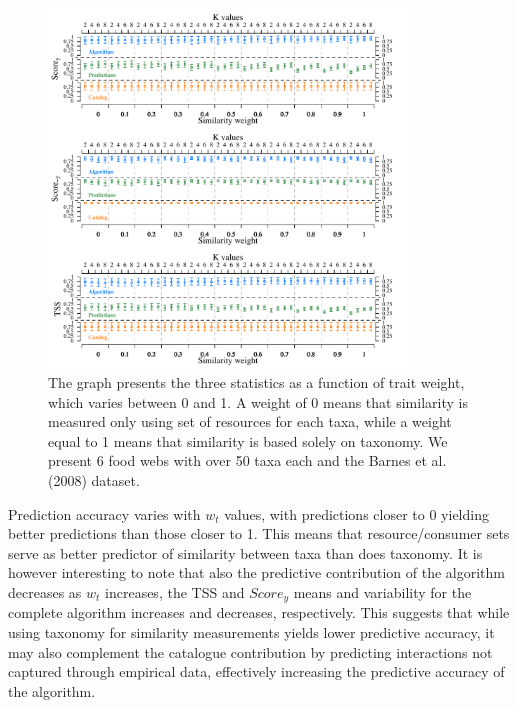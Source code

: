 \documentclass[letterpaper]{article}
\begin{document}
\begin{figure}[h]
  \centering\includegraphics[width=0.85\textwidth]{multiple_parameters2.pdf}
  \caption{The graph presents the three statistics as a function of trait weight, which varies between 0 and 1. A weight of 0 means that similarity is measured only using set of resources for each taxa, while a weight equal to 1 means that similarity is based solely on taxonomy. We present 6 food webs with over 50 taxa each and the Barnes et al. (2008) dataset.}
  \label{fig:multi_param}
\end{figure}

Prediction accuracy varies with $w_t$ values, with predictions closer to 0 yielding better predictions than those closer to 1. This means that resource/consumer sets serve as better predictor of similarity between taxa than does taxonomy. It is however interesting to note that also the predictive contribution of the algorithm decreases as $w_t$ increases, the TSS and $Score_y$ means and variability for the complete algorithm increases and decreases, respectively. This suggests that while using taxonomy for similarity measurements yields lower predictive accuracy, it may also complement the catalogue contribution by predicting interactions not captured through empirical data, effectively increasing the predictive accuracy of the algorithm.

\end{document}
